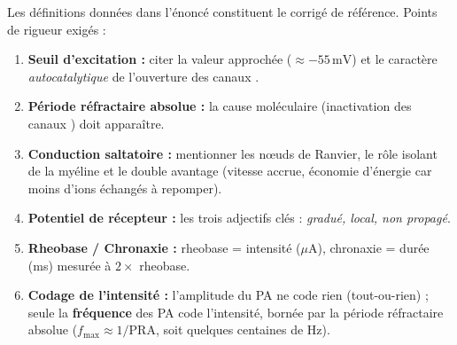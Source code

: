 \documentclass[11pt]{article}
\begin{document}
\begin{corrige}
Les définitions données dans l'énoncé constituent le corrigé de référence. Points de rigueur exigés :
\begin{enumerate}
\item \textbf{Seuil d'excitation :} citer la valeur approchée ($\approx -55\,\text{mV}$) et le caractère \emph{autocatalytique} de l'ouverture des canaux .
\item \textbf{Période réfractaire absolue :} la cause moléculaire (inactivation des canaux ) doit apparaître.
\item \textbf{Conduction saltatoire :} mentionner les nœuds de Ranvier, le rôle isolant de la myéline et le double avantage (vitesse accrue, économie d'énergie car moins d'ions échangés à repomper).
\item \textbf{Potentiel de récepteur :} les trois adjectifs clés : \emph{gradué, local, non propagé}.
\item \textbf{Rheobase / Chronaxie :} rheobase = intensité ($\mu\text{A}$), chronaxie = durée (ms) mesurée à $2 \times$ rheobase.
\item \textbf{Codage de l'intensité :} l'amplitude du PA ne code rien (tout-ou-rien) ; seule la \textbf{fréquence} des PA code l'intensité, bornée par la période réfractaire absolue ($f_{\max} \approx 1/\text{PRA}$, soit quelques centaines de Hz).
\end{enumerate}
\end{corrige}
\end{document}
